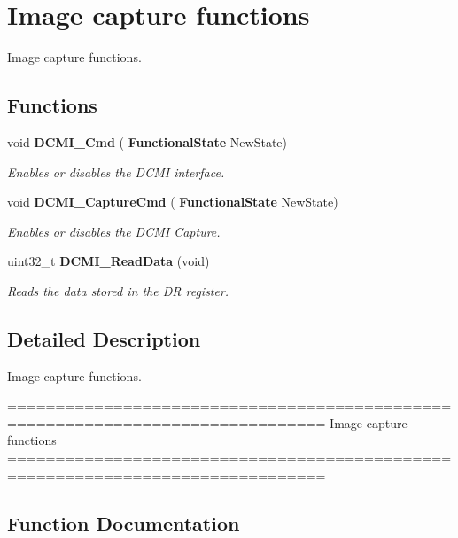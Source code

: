 \section{Image capture functions}
\label{group__DCMI__Group2}


Image capture functions.  


\subsection*{Functions}
\begin{DoxyCompactItemize}
\item 
void \textbf{ D\+C\+M\+I\+\_\+\+Cmd} (\textbf{ Functional\+State} New\+State)
\begin{DoxyCompactList}\small\item\em Enables or disables the D\+C\+MI interface. \end{DoxyCompactList}\item 
void \textbf{ D\+C\+M\+I\+\_\+\+Capture\+Cmd} (\textbf{ Functional\+State} New\+State)
\begin{DoxyCompactList}\small\item\em Enables or disables the D\+C\+MI Capture. \end{DoxyCompactList}\item 
uint32\+\_\+t \textbf{ D\+C\+M\+I\+\_\+\+Read\+Data} (void)
\begin{DoxyCompactList}\small\item\em Reads the data stored in the DR register. \end{DoxyCompactList}\end{DoxyCompactItemize}


\subsection{Detailed Description}
Image capture functions. 

\begin{DoxyVerb} ===============================================================================
                                 Image capture functions
 ===============================================================================  \end{DoxyVerb}
 

\subsection{Function Documentation}
\mbox{\label{group__DCMI__Group2_gad00fb33497ffa337a5b2b77fc6aa8d74}} 
